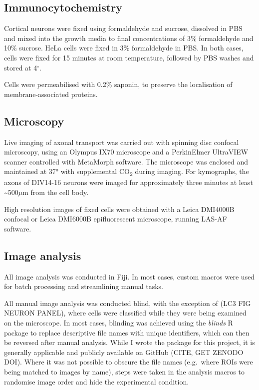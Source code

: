 \documentclass[
  12pt,
  a4paper,
]{book}
\begin{document}
\hypertarget{immuno}{%
\subsection{Immunocytochemistry}\label{immuno}}

Cortical neurons were fixed using formaldehyde and sucrose, dissolved in PBS and mixed into the growth media to final concentrations of 3\% formaldehyde and 10\% sucrose. HeLa cells were fixed in 3\% formaldehyde in PBS. In both cases, cells were fixed for 15 minutes at room temperature, followed by PBS washes and stored at 4\(^{\circ}\).

Cells were permeabilised with 0.2\% saponin, to preserve the localisation of membrane-associated proteins.

\hypertarget{microscopy}{%
\subsection{Microscopy}\label{microscopy}}

Live imaging of axonal transport was carried out with spinning disc confocal microscopy, using an Olympus IX70 microscope and a PerkinElmer UltraVIEW scanner controlled with MetaMorph software. The microscope was enclosed and maintained at 37° with supplemental CO\textsubscript{2} during imaging. For kymographs, the axons of DIV14-16 neurons were imaged for approximately three minutes at least \textasciitilde500\(\mu\)m from the cell body.

High resolution images of fixed cells were obtained with a Leica DMI4000B confocal or Leica DMI6000B epifluorescent microscope, running LAS-AF software.

\hypertarget{image-analysis}{%
\subsection{Image analysis}\label{image-analysis}}

All image analysis was conducted in Fiji. In most cases, custom macros were used for batch processing and streamlining manual tasks.

All manual image analysis was conducted blind, with the exception of (LC3 FIG NEURON PANEL), where cells were classified while they were being examined on the microscope. In most cases, blinding was achieved using the \emph{blinds} R package to replace descriptive file names with unique identifiers, which can then be reversed after manual analysis. While I wrote the package for this project, it is generally applicable and publicly available on GitHub (CITE, GET ZENODO DOI). Where it was not possible to obscure the file names (e.g.~where ROIs were being matched to images by name), steps were taken in the analysis macros to randomise image order and hide the experimental condition.
\end{document}
